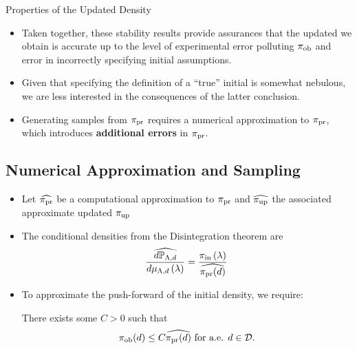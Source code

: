 \begin{frame}[t]{Properties of the Updated Density}
\begin{itemize}

	\item Taken together, these stability results provide assurances that the updated we obtain is accurate up to the level of experimental error polluting $\operatorname*{\pi_{ob}}$ and error in incorrectly specifying initial assumptions.
	\item Given that specifying the definition of a ``true'' initial is somewhat nebulous, we are less interested in the consequences of the latter conclusion.
	\item Generating samples from $\operatorname*{\pi_{pr}}$ requires a numerical approximation to $\operatorname*{\pi_{pr}}$, which introduces \textbf{additional errors} in $\operatorname*{\pi_{pr}}$.

\end{itemize}

\end{frame}


\subsection{Numerical Approximation and Sampling}
\begin{frame}[t]
\begin{itemize}
	\item Let $\widehat{\operatorname*{\pi_{pr}}}$ be a computational approximation to $\operatorname*{\pi_{pr}}$ and $\widehat{\operatorname*{\pi_{up}}}$ the associated approximate updated $\operatorname*{\pi_{up}}$
	\item The conditional densities from the Disintegration theorem are
\[
\frac{\widehat{d\mathbb{P}_{{\Lambda}, d}}}{d\mu_{{\Lambda}, d}\left ( \lambda \right )} = \frac{\operatorname*{\pi_{in}}\left ( \lambda \right )}{ \widehat{\operatorname*{\pi_{pr}} (d)} }
\]
\vspace{0.25in}
	\item To approximate the push-forward of the initial density, we require:
\begin{assumption}\label{as:predx}
There exists some $C>0$ such that
\[
\operatorname*{\pi_{ob}} (d) \leq C \widehat{\operatorname*{\pi_{pr}}(d)} \text{ for a.e. } d\in \mathcal{D}.
\]
\end{assumption}

\end{itemize}

\end{frame}


